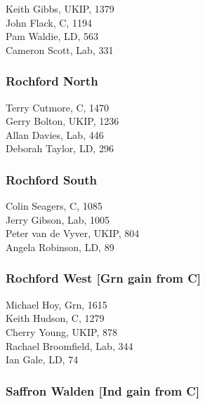 \documentclass[a4paper,openany,10pt]{book}
\begin{document}


Keith Gibbs, UKIP, 1379\\
John Flack, C, 1194\\
Pam Waldie, LD, 563\\
Cameron Scott, Lab, 331\\


\subsubsection*{Rochford North}



Terry Cutmore, C, 1470\\
Gerry Bolton, UKIP, 1236\\
Allan Davies, Lab, 446\\
Deborah Taylor, LD, 296\\


\subsubsection*{Rochford South}



Colin Seagers, C, 1085\\
Jerry Gibson, Lab, 1005\\
Peter van de Vyver, UKIP, 804\\
Angela Robinson, LD, 89\\


\subsubsection*{Rochford West \hspace*{\fill}\nolinebreak[1]%
\enspace\hspace*{\fill}
[Grn gain from C]}



Michael Hoy, Grn, 1615\\
Keith Hudson, C, 1279\\
Cherry Young, UKIP, 878\\
Rachael Broomfield, Lab, 344\\
Ian Gale, LD, 74\\


\subsubsection*{Saffron Walden \hspace*{\fill}\nolinebreak[1]%
\enspace\hspace*{\fill}
[Ind gain from C]}
\end{document}
